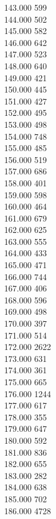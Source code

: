{ 143.000	599 \\
 144.000	502 \\
 145.000	582 \\
 146.000	642 \\
 147.000	523 \\
 148.000	640 \\
 149.000	421 \\
 150.000	445 \\
 151.000	427 \\
 152.000	495 \\
 153.000	498 \\
 154.000	748 \\
 155.000	485 \\
 156.000	519 \\
 157.000	686 \\
 158.000	401 \\
 159.000	598 \\
 160.000	464 \\
 161.000	679 \\
 162.000	625 \\
 163.000	555 \\
 164.000	433 \\
 165.000	471 \\
 166.000	744 \\
 167.000	406 \\
 168.000	596 \\
 169.000	498 \\
 170.000	397 \\
 171.000	514 \\
 172.000	2622 \\
 173.000	631 \\
 174.000	361 \\
 175.000	665 \\
 176.000	1244 \\
 177.000	617 \\
 178.000	355 \\
 179.000	647 \\
 180.000	592 \\
 181.000	836 \\
 182.000	655 \\
 183.000	282 \\
 184.000	638 \\
 185.000	702 \\
 186.000	4728 \\
}
